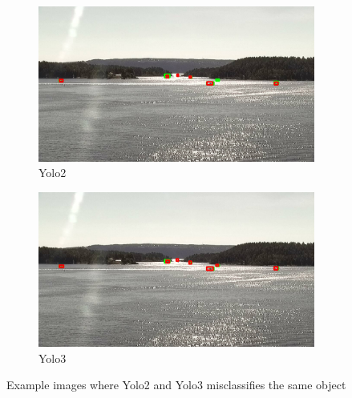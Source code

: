 \begin{figure}[h!]
\begin{subfigure}{.5\textwidth}
  \centering
  \includegraphics[width=0.9\linewidth]{results/case_buildings/yolo23/samemistake/yolo2/selected_08_11_frame3200.jpg}
  \caption{Yolo2}
\end{subfigure}%
\begin{subfigure}{.5\textwidth}
  \centering
  \includegraphics[width=.9\linewidth]{results/case_buildings/yolo23/samemistake/yolo3/selected_08_11_frame3200.jpg}
  \caption{Yolo3}
\end{subfigure}
\caption{Example images where Yolo2 and Yolo3 misclassifies the same object}
\label{img:yolo2_better}

\end{figure}

